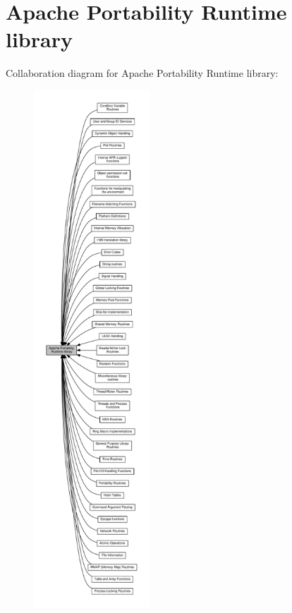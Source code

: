\hypertarget{group__APR}{}\section{Apache Portability Runtime library}
\label{group__APR}
Collaboration diagram for Apache Portability Runtime library\+:
\nopagebreak
\begin{figure}[H]
\begin{center}
\leavevmode
\includegraphics[height=550pt]{group__APR}
\end{center}
\end{figure}
